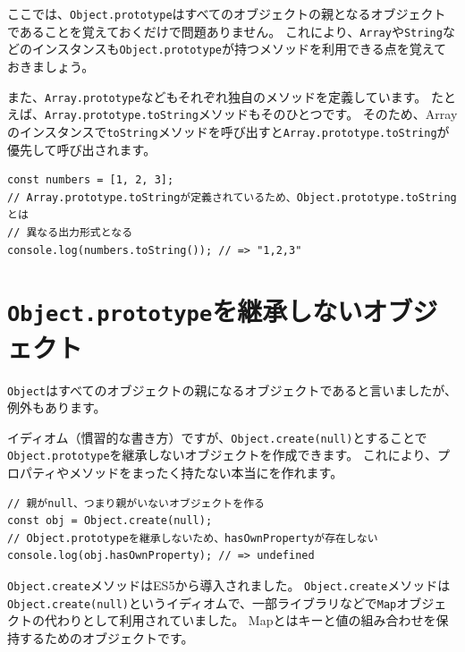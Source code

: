 ここでは、\texttt{Object.prototype}はすべてのオブジェクトの親となるオブジェクトであることを覚えておくだけで問題ありません。
これにより、\texttt{Array}や\texttt{String}などのインスタンスも\texttt{Object.prototype}が持つメソッドを利用できる点を覚えておきましょう。

また、\texttt{Array.prototype}などもそれぞれ独自のメソッドを定義しています。
たとえば、\texttt{Array.prototype.toString}メソッドもそのひとつです。
そのため、Arrayのインスタンスで\texttt{toString}メソッドを呼び出すと\texttt{Array.prototype.toString}が優先して呼び出されます。

\begin{lstlisting}
const numbers = [1, 2, 3];
// Array.prototype.toStringが定義されているため、Object.prototype.toStringとは
// 異なる出力形式となる
console.log(numbers.toString()); // => "1,2,3"
\end{lstlisting}

\hypertarget{not-inherit-object}{%
\section{\texttt{Object.prototype}を継承しないオブジェクト}\label{not-inherit-object}}

\texttt{Object}はすべてのオブジェクトの親になるオブジェクトであると言いましたが、例外もあります。

イディオム（慣習的な書き方）ですが、\texttt{Object.create(null)}とすることで\texttt{Object.prototype}を継承しないオブジェクトを作成できます。
これにより、プロパティやメソッドをまったく持たない本当に\textbf{}を作れます。

\begin{lstlisting}
// 親がnull、つまり親がいないオブジェクトを作る
const obj = Object.create(null);
// Object.prototypeを継承しないため、hasOwnPropertyが存在しない
console.log(obj.hasOwnProperty); // => undefined
\end{lstlisting}

\texttt{Object.create}メソッドはES5から導入されました。
\texttt{Object.create}メソッドは\texttt{Object.create\newline (null)}というイディオムで、一部ライブラリなどで\texttt{Map}オブジェクトの代わりとして利用されていました。
Mapとはキーと値の組み合わせを保持するためのオブジェクトです。

